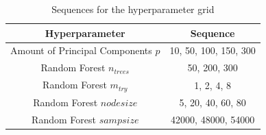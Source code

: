 \documentclass[conference]{IEEEtran}
\begin{document}
\begin{table}[htbp]
    \color{til}
    \caption{\color{til}Sequences for the hyperparameter grid}
    \begin{center}
    \begin{tabular}{|c|c|}
        \hline
        \textbf{Hyperparameter} & \textbf{Sequence} \\
        \hline
        Amount of Principal Components $p$ & 10, 50, 100, 150, 300\\
        \hline
        Random Forest $n_{trees}$ & 50, 200, 300\\
        \hline
        Random Forest $m_{try}$ & 1, 2, 4, 8\\
        \hline
        Random Forest ${nodesize}$ & 5, 20, 40, 60, 80\\
        \hline
        Random Forest ${sampsize}$ & 42000, 48000, 54000\\
        \hline
    \end{tabular}
    \label{table:hyperParamGrid}
    \end{center}
\end{table}
\end{document}
